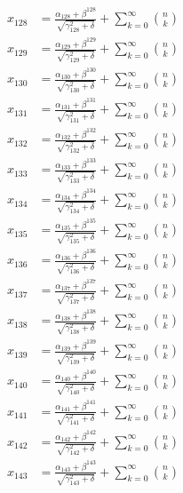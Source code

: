 \documentclass{article}
\begin{document}
\begin{align}
  x_{128} &= \frac{\alpha_{128} + \beta^{128}}{\sqrt{\gamma_{128}^2 + \delta}} + \sum_{k=0}^{\infty} \binom{n}{k} \label{eq:128} \\
  x_{129} &= \frac{\alpha_{129} + \beta^{129}}{\sqrt{\gamma_{129}^2 + \delta}} + \sum_{k=0}^{\infty} \binom{n}{k} \label{eq:129} \\
  x_{130} &= \frac{\alpha_{130} + \beta^{130}}{\sqrt{\gamma_{130}^2 + \delta}} + \sum_{k=0}^{\infty} \binom{n}{k} \label{eq:130} \\
  x_{131} &= \frac{\alpha_{131} + \beta^{131}}{\sqrt{\gamma_{131}^2 + \delta}} + \sum_{k=0}^{\infty} \binom{n}{k} \label{eq:131} \\
  x_{132} &= \frac{\alpha_{132} + \beta^{132}}{\sqrt{\gamma_{132}^2 + \delta}} + \sum_{k=0}^{\infty} \binom{n}{k} \label{eq:132} \\
  x_{133} &= \frac{\alpha_{133} + \beta^{133}}{\sqrt{\gamma_{133}^2 + \delta}} + \sum_{k=0}^{\infty} \binom{n}{k} \label{eq:133} \\
  x_{134} &= \frac{\alpha_{134} + \beta^{134}}{\sqrt{\gamma_{134}^2 + \delta}} + \sum_{k=0}^{\infty} \binom{n}{k} \label{eq:134} \\
  x_{135} &= \frac{\alpha_{135} + \beta^{135}}{\sqrt{\gamma_{135}^2 + \delta}} + \sum_{k=0}^{\infty} \binom{n}{k} \label{eq:135} \\
  x_{136} &= \frac{\alpha_{136} + \beta^{136}}{\sqrt{\gamma_{136}^2 + \delta}} + \sum_{k=0}^{\infty} \binom{n}{k} \label{eq:136} \\
  x_{137} &= \frac{\alpha_{137} + \beta^{137}}{\sqrt{\gamma_{137}^2 + \delta}} + \sum_{k=0}^{\infty} \binom{n}{k} \label{eq:137} \\
  x_{138} &= \frac{\alpha_{138} + \beta^{138}}{\sqrt{\gamma_{138}^2 + \delta}} + \sum_{k=0}^{\infty} \binom{n}{k} \label{eq:138} \\
  x_{139} &= \frac{\alpha_{139} + \beta^{139}}{\sqrt{\gamma_{139}^2 + \delta}} + \sum_{k=0}^{\infty} \binom{n}{k} \label{eq:139} \\
  x_{140} &= \frac{\alpha_{140} + \beta^{140}}{\sqrt{\gamma_{140}^2 + \delta}} + \sum_{k=0}^{\infty} \binom{n}{k} \label{eq:140} \\
  x_{141} &= \frac{\alpha_{141} + \beta^{141}}{\sqrt{\gamma_{141}^2 + \delta}} + \sum_{k=0}^{\infty} \binom{n}{k} \label{eq:141} \\
  x_{142} &= \frac{\alpha_{142} + \beta^{142}}{\sqrt{\gamma_{142}^2 + \delta}} + \sum_{k=0}^{\infty} \binom{n}{k} \label{eq:142} \\
  x_{143} &= \frac{\alpha_{143} + \beta^{143}}{\sqrt{\gamma_{143}^2 + \delta}} + \sum_{k=0}^{\infty} \binom{n}{k} \label{eq:143} \\

\end{align}
\end{document}

